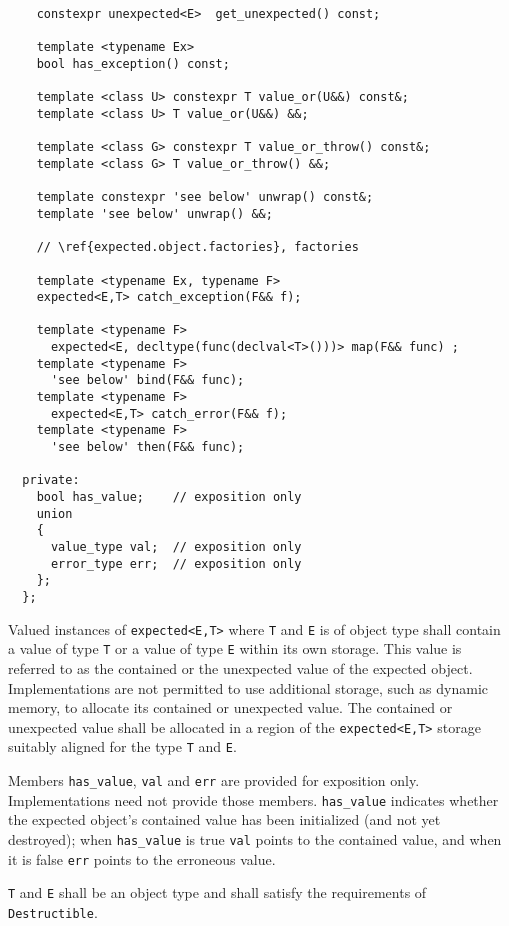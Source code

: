 \documentclass[a4paper,10pt]{article}
\newcommand{\cpp}[1]{\lstinline{#1}}
\begin{document}
\begin{lstlisting}
    constexpr unexpected<E>  get_unexpected() const;
    
    template <typename Ex>
    bool has_exception() const;
      
    template <class U> constexpr T value_or(U&&) const&;
    template <class U> T value_or(U&&) &&;
    
    template <class G> constexpr T value_or_throw() const&;
    template <class G> T value_or_throw() &&;

    template constexpr 'see below' unwrap() const&;
    template 'see below' unwrap() &&;

    // \ref{expected.object.factories}, factories

    template <typename Ex, typename F>
    expected<E,T> catch_exception(F&& f);

    template <typename F>
      expected<E, decltype(func(declval<T>()))> map(F&& func) ;
    template <typename F>
      'see below' bind(F&& func);
    template <typename F>
      expected<E,T> catch_error(F&& f);
    template <typename F>
      'see below' then(F&& func);
  
  private:
    bool has_value;    // exposition only
    union
    {
      value_type val;  // exposition only
      error_type err;  // exposition only
    };
  };

\end{lstlisting}


Valued instances of \cpp{expected<E,T>} where \cpp{T} and \cpp{E} is of object type shall contain a value of type \cpp{T} or a value of type \cpp{E} within its own storage. This value is referred to as the contained or the unexpected value of the expected object. Implementations are not permitted to use additional storage, such as dynamic memory, to allocate its contained or unexpected value. The contained or unexpected value shall be allocated in a region of the \cpp{expected<E,T>} storage suitably aligned for the type \cpp{T} and \cpp{E}.
\newline

Members \cpp{has_value}, \cpp{val} and \cpp{err} are provided for exposition only. Implementations need not provide those members. \cpp{has_value} indicates whether the expected object's contained value has been initialized (and not yet destroyed); when \cpp{has_value} is true \cpp{val} points to the contained value, and when it is false \cpp{err} points to the erroneous value. 

\cpp{T} and \cpp{E} shall be an object type and shall satisfy the requirements of \cpp{Destructible}.
\end{document}
